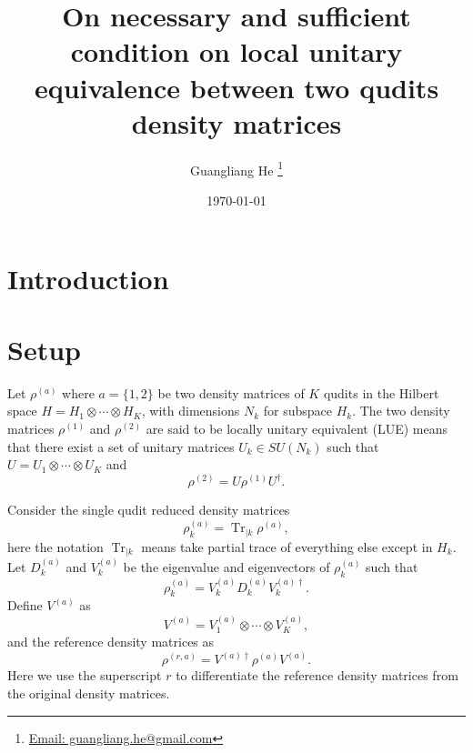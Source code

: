 \documentclass{article}
\title{On necessary and sufficient condition on local unitary equivalence
  between two qudits density matrices}
\author{Guangliang He
  \thanks{\href{mailto:guangliang.he@gmail.com}
    {Email: guangliang.he@gmail.com}}}
\date{\today}
\DeclareMathOperator{\Tr}{Tr}
\begin{document}
\maketitle

\section{Introduction}
\cite{Li_2014, Martins_2015}

\section{Setup}
Let $\rho^{(a)}$ where $a = \{1, 2\}$  be two density matrices of $K$ qudits
in the Hilbert space $H = H_1\otimes\cdots\otimes H_K$, with dimensions
$N_k$ for subspace $H_k$. The two density matrices $\rho^{(1)}$ and $\rho^{(2)}$
are said to be locally unitary equivalent (LUE) means that there exist a set
of unitary matrices $U_k\in SU(N_k)$ such that
$U = U_1\otimes\cdots\otimes U_K$ and
\begin{equation}
  \label{eq:rho_lue}
  \rho^{(2)} = U\rho^{(1)}U^\dagger.
\end{equation}

Consider the single qudit reduced density matrices
\begin{equation}
  \rho^{(a)}_k = \Tr_{|k}\rho^{(a)},
\end{equation}
here the notation $\Tr_{|k}$ means take partial trace of everything else
except in $H_k$.  Let $D_k^{(a)}$ and $V_k^{(a)}$ be the eigenvalue and
eigenvectors of $\rho_k^{(a)}$ such that
\begin{equation}
  \rho^{(a)}_k = V^{(a)}_kD^{(a)}_kV^{(a)\dagger}_k.
\end{equation}
Define $V^{(a)}$ as
\begin{equation}
  V^{(a)} = V^{(a)}_1\otimes\cdots\otimes V^{(a)}_K,
\end{equation}
and the reference density matrices as
\begin{equation}
  \label{eq:rho_ref}
  \rho^{(r, a)} = V^{(a)\dagger}\rho^{(a)}V^{(a)}.
\end{equation}
Here we use the superscript $r$ to differentiate the reference density matrices
from the original density matrices.
\end{document}
